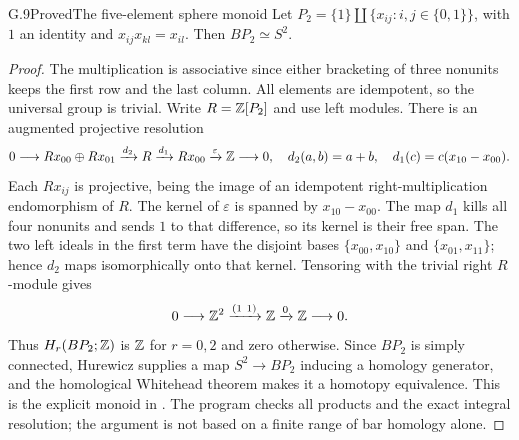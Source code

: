 \begin{claim}{G.9}{Proved}{The five-element sphere monoid}
Let $P_2=\{1\}\amalg\{x_{ij}:i,j\in\{0,1\}\}$, with $1$ an identity and $x_{ij}x_{kl}=x_{il}$. Then $BP_2\simeq S^2$.
\end{claim}
\begin{proof}
The multiplication is associative since either bracketing of three nonunits keeps the first row and the last column. All elements are idempotent, so the universal group is trivial. Write $R=\mathbb Z[P_2]$ and use left modules. There is an augmented projective resolution
\[
0\longrightarrow Rx_{00}\oplus Rx_{01}
 \xrightarrow{d_2} R\xrightarrow{d_1}Rx_{00}
 \xrightarrow{\varepsilon}\mathbb Z\longrightarrow0,
\quad
 d_2(a,b)=a+b,\quad d_1(c)=c(x_{10}-x_{00}).
\]
Each $Rx_{ij}$ is projective, being the image of an idempotent right-multiplication endomorphism of $R$. The kernel of $\varepsilon$ is spanned by $x_{10}-x_{00}$. The map $d_1$ kills all four nonunits and sends $1$ to that difference, so its kernel is their free span. The two left ideals in the first term have the disjoint bases $\{x_{00},x_{10}\}$ and $\{x_{01},x_{11}\}$; hence $d_2$ maps isomorphically onto that kernel. Tensoring with the trivial right $R$-module gives
\[
                  0\longrightarrow\Z^2\xrightarrow{(1\ 1)}\Z
                     \xrightarrow{0}\Z\longrightarrow0.
\]
Thus $H_r(BP_2;\mathbb Z)$ is $\mathbb Z$ for $r=0,2$ and zero otherwise. Since $BP_2$ is simply connected, Hurewicz supplies a map $S^2\to BP_2$ inducing a homology generator, and the homological Whitehead theorem makes it a homotopy equivalence. This is the explicit monoid in \citet[unnumbered Lemma, pp.~33--34]{Fiedorowicz2002}. The program checks all products and the exact integral resolution; the argument is not based on a finite range of bar homology alone.
\end{proof}

